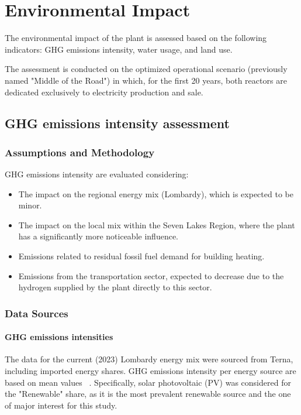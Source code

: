 \section{Environmental Impact}
The environmental impact of the plant is assessed based on the following indicators: GHG emissions intensity, water usage, and land use.

The assessment is conducted on the optimized operational scenario (previously named "Middle of the Road") in which, for the first 20 years, both reactors are dedicated exclusively to electricity production and sale.


\subsection{GHG emissions intensity assessment}

\subsubsection{Assumptions and Methodology}
GHG emissions intensity are evaluated considering:

\begin{itemize}
    \item The impact on the regional energy mix (Lombardy), which is expected to be minor.
    \item The impact on the local mix within the Seven Lakes Region, where the plant has a significantly more noticeable influence.
    \item Emissions related to residual fossil fuel demand for building heating.
    \item Emissions from the transportation sector, expected to decrease due to the hydrogen supplied by the plant directly to this sector.
\end{itemize}

\subsubsection{Data Sources}
\paragraph{GHG emissions intensities}
The data for the current (2023) Lombardy energy mix were sourced from Terna, including imported energy shares. GHG emissions intensity per energy source are based on mean values ~\cite{weisser2007guide}. Specifically, solar photovoltaic (PV) was considered for the "Renewable" share, as it is the most prevalent renewable source and the one of major interest for this study.

